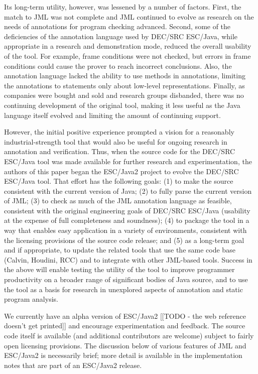 \documentclass{acm_proc_article-sp}
\begin{document}
Its long-term utility, however, was lessened by a number of factors.
First, the match to JML was not complete and JML continued to evolve
as research on the needs of annotations for program checking advanced.
Second, some of the deficiencies of the annotation language used by
DEC/SRC ESC/Java, while appropriate in a research 
and demonstration mode, reduced the
overall usability of the tool.  For example, frame conditions were not
checked, but errors in frame conditions could cause the prover to
reach incorrect conclusions.  Also, the annotation language lacked the
ability to use methods in annotations, limiting the annotations to
statements only about low-level representations.  Finally, as
companies were bought and sold and research groups disbanded, there
was no continuing development of the original tool, making it
less useful as the Java language itself evolved and limiting the
amount of continuing support.

However, the initial positive experience prompted a vision for a
reasonably industrial-strength tool that would also be useful for
ongoing research in annotation and verification.  Thus, when the
source code for the DEC/SRC ESC/Java tool was made available for
further research and experimentation, the authors of this paper began
the ESC/Java2 project to evolve the DEC/SRC ESC/Java tool.  That
effort has the following goals:
(1) to make the source consistent with the current version of Java;
(2) to fully parse the current version of JML;
(3) to check as much of the JML annotation language as feasible,
consistent with the original engineering goals of DEC/SRC ESC/Java
(usability at the expense of full completeness and soundness); 
(4) to package the tool in a way that enables easy application in a
variety of environments, consistent with the licensing provisions of
the source code release;
and
(5) as a long-term goal and if appropriate, to update the related
tools that use the same code base (Calvin, Houdini, RCC) and to
integrate with other JML-based tools.  Success in the above will
enable testing the utility of the tool to improve programmer
productivity on a broader range of significant bodies of Java source,
and to use the tool as a basis for research in unexplored aspects of
annotation and static program analysis.
  
We currently have an alpha version of ESC/Java2
[[TODO - the web reference doesn't get printed]]
 and encourage experimentation and feedback.  The source
code itself is available (and additional contributors are welcome)
subject to fairly open licensing provisions.  The discussion below of various
features of JML and ESC/Java2 is necessarily brief; more detail is
available in the implementation notes that are part of an ESC/Java2 release.
\end{document}
